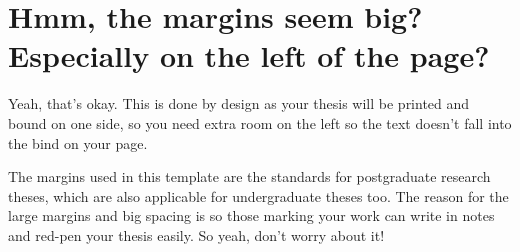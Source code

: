 \section{Hmm, the margins seem big? Especially on the left of the page?}
Yeah, that's okay. This is done by design as your thesis will be printed and bound on one side, so you need extra room on the left so the text doesn't fall into the bind on your page.

The margins used in this template are the standards for postgraduate research theses, which are also applicable for undergraduate theses too. The reason for the large margins and big spacing is so those marking your work can write in notes and red-pen your thesis easily. So yeah, don't worry about it!

\cleardoublepage